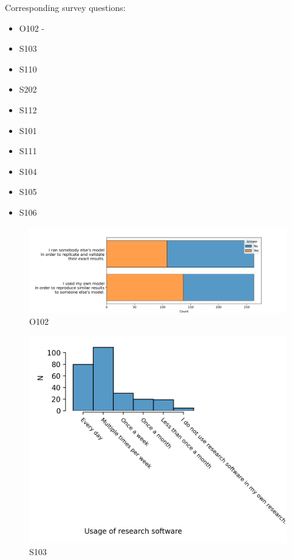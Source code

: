 \documentclass{article}
\begin{document}
Corresponding survey questions:
\begin{itemize}
	\item O102 -
	\item S103
	\item S110
	\item S202
	\item S112
	\item S101
	\item S111
	\item S104
	\item S105
	\item S106
\end{itemize}

\begin{figure}[!p]
    \centering
    \includegraphics[width=\textwidth]{../figs/O102.png}
	\caption{O102 }
    \label{fig:O102}
\end{figure}

\begin{figure}[!p]
    \centering
    \includegraphics[width=\textwidth]{../figs/S103.png}
	\caption{S103 }
    \label{fig:S103}
\end{figure}
\end{document}
